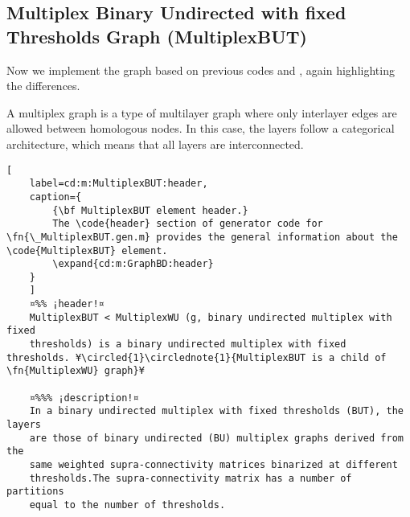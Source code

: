 \documentclass{tufte-handout}
\begin{document}
\clearpage

\subsection{Multiplex Binary Undirected with fixed Thresholds Graph (MultiplexBUT)}

Now we implement the  graph based on previous codes  and , again highlighting the differences.

A multiplex graph is a type of multilayer graph where only interlayer edges are allowed between homologous nodes. In this case, the layers follow a categorical architecture, which means that all layers are interconnected.


\begin{lstlisting}[
	label=cd:m:MultiplexBUT:header,
	caption={
		{\bf MultiplexBUT element header.}
		The \code{header} section of generator code for \fn{\_MultiplexBUT.gen.m} provides the general information about the \code{MultiplexBUT} element.
		\expand{cd:m:GraphBD:header}
	}
	]
	¤%% ¡header!¤
	MultiplexBUT < MultiplexWU (g, binary undirected multiplex with fixed
	thresholds) is a binary undirected multiplex with fixed thresholds. ¥\circled{1}\circlednote{1}{MultiplexBUT is a child of \fn{MultiplexWU} graph}¥
	
	¤%%% ¡description!¤
	In a binary undirected multiplex with fixed thresholds (BUT), the layers
	are those of binary undirected (BU) multiplex graphs derived from the
	same weighted supra-connectivity matrices binarized at different
	thresholds.The supra-connectivity matrix has a number of partitions
	equal to the number of thresholds.

\end{lstlisting}
\end{document}
